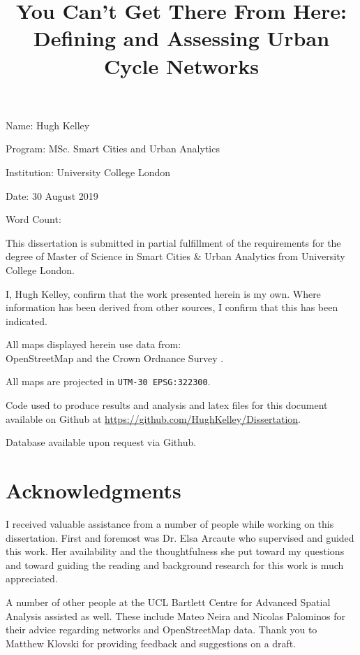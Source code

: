 \documentclass[hidelinks,11pt]{article} %
\title{You Can't Get There From Here: \\Defining and Assessing Urban Cycle Networks}
\author{}
\date{} %
\begin{document}
\maketitle



Name: Hugh Kelley

Program: MSc. Smart Cities and Urban Analytics

Institution: University College London

Date: 30 August 2019

Word Count:

This dissertation is submitted in partial fulfillment of the requirements for the degree of Master of Science in Smart Cities \& Urban Analytics from University College London.

I, Hugh Kelley, confirm that the work presented herein is my own. Where information has been derived from other sources, I confirm that this has been indicated.
\pagebreak

All maps displayed herein use data from: \\
 OpenStreetMap  and the Crown Ordnance Survey .

\medskip
 
All maps are projected in \texttt{UTM-30 EPSG:322300}.

\medskip

Code used to produce results and analysis and latex files for this document available on Github at \url{https://github.com/HughKelley/Dissertation}. 

\medskip

Database available upon request via Github. 

\pagebreak

\section{Acknowledgments}

I received valuable assistance from a number of people while working on this dissertation. First and foremost was Dr. Elsa Arcaute who supervised and guided this work. Her availability and the thoughtfulness she put toward my questions and toward guiding the reading and background research for this work is much appreciated. 

A number of other people at the UCL Bartlett Centre for Advanced Spatial Analysis assisted as well. These include  Mateo Neira and Nicolas Palominos for their advice regarding networks and OpenStreetMap data. Thank you to Matthew Klovski for providing feedback and suggestions on a draft.  
\end{document}
